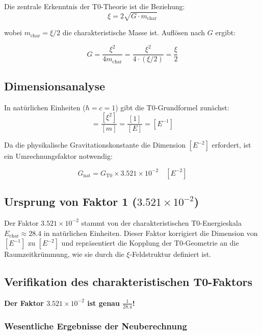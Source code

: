 	Die zentrale Erkenntnis der T0-Theorie ist die Beziehung:
	\begin{equation}
		\xi = 2\sqrt{G \cdot m_{\text{char}}}
	\end{equation}
	
	wobei $m_{\text{char}} = \xi/2$ die charakteristische Masse ist. Auflösen nach $G$ ergibt:
	
	\begin{equation}
		\boxed{G = \frac{\xi^2}{4m_{\text{char}}} = \frac{\xi^2}{4 \cdot (\xi/2)} = \frac{\xi}{2}}
	\end{equation}
	
	\subsection{Dimensionsanalyse}
	
	In natürlichen Einheiten ($\hbar = c = 1$) gibt die T0-Grundformel zunächst:
	\begin{equation}
		[G_{\text{T0}}] = \frac{[\xi^2]}{[m]} = \frac{[1]}{[E]} = [E^{-1}]
	\end{equation}
	
	Da die physikalische Gravitationskonstante die Dimension $[E^{-2}]$ erfordert, ist ein Umrechnungsfaktor notwendig:
	
	\begin{equation}
		G_{\text{nat}} = G_{\text{T0}} \times 3.521 \times 10^{-2} \quad [E^{-2}]
	\end{equation}
	
	\subsection{Ursprung von Faktor 1 ($3.521 \times 10^{-2}$)}
	
	Der Faktor $3.521 \times 10^{-2}$ stammt von der charakteristischen T0-Energieskala $E_{\text{char}} \approx 28.4$ in natürlichen Einheiten. Dieser Faktor korrigiert die Dimension von $[E^{-1}]$ zu $[E^{-2}]$ und repräsentiert die Kopplung der T0-Geometrie an die Raumzeitkrümmung, wie sie durch die $\xi$-Feldstruktur definiert ist.
	
	\subsection{Verifikation des charakteristischen T0-Faktors}
	
	\textbf{Der Faktor $3.521 \times 10^{-2}$ ist genau $\frac{1}{28.4}$!}
	
	\subsubsection{Wesentliche Ergebnisse der Neuberechnung}
	
